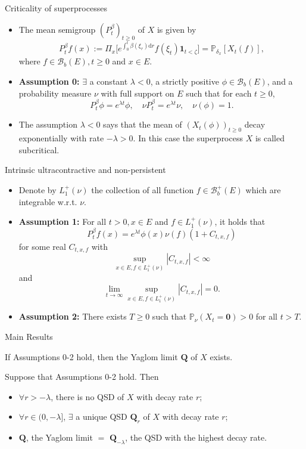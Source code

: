 \documentclass[xcolor=dvipsnames]{beamer}
\begin{document}
\begin{frame}{Criticality of superprocesses}
\begin{itemize}
\item 
	The mean semigroup $(P_t^\beta)_{t\geq 0}$ of $X$ is given by 
\[
	P_t^\beta f(x) 
	:= \Pi_x\Big[e^{\int_0^t \beta(\xi_r) \mathrm dr} f(\xi_t) \mathbf 1_{t< \zeta}\Big]
	= \mathbb P_{\delta_x}[X_t(f)],
\]
	where $f \in \mathcal B_b(E), t\geq 0$ and $x\in E$.
\item
	{\bf Assumption 0:} $\exists$ a constant $\lambda < 0$, a strictly positive $\phi\in \mathcal B_b(E)$, and a probability measure $\nu$ with full support on $E$ such that for each $t\geq 0$,
\[
	P_t^\beta \phi = e^{\lambda t}\phi,
	\quad \nu P_t^\beta = e^{\lambda t}\nu,
	\quad \nu(\phi) = 1.
\]
\item
	The assumption $\lambda < 0$ says that the mean of $(X_t(\phi))_{t\geq 0}$ decay exponentially with rate $-\lambda>0$. 
	In this case the superprocess $X$ is called {\color{red} subcritical}. 
\end{itemize}
\end{frame}

\begin{frame}{Intrinsic ultracontractive and non-persistent}
\begin{itemize}
\item
	Denote by $L_1^+(\nu)$ the collection of all function $f\in \mathcal B_b^+(E)$ which are integrable w.r.t. $\nu$.
\item 
	{\bf Assumption 1:} For all $t>0, x\in E$ and $f\in L_1^+(\nu)$, it holds that 
	\[
		P_t^\beta f(x) = e^{\lambda t} \phi(x) \nu(f) (1+ C_{t,x,f})
	\] 
	for some real $C_{t,x,f}$ with
	\[\sup_{x\in E, f\in L_1^+(\nu)}|C_{t,x,f}|< \infty\] and
	\[\lim_{t\to \infty}\sup_{x\in E, f\in L_1^+(\nu)}|C_{t,x,f}| =0.\]
\item
	{\bf Assumption 2:} There exists $T\geq 0$ such that $\mathbb P_\nu(X_t=\mathbf 0)>0$ for all $t>T$. 
\end{itemize}
\end{frame}

\begin{frame}{Main Results}
\begin{theorem}
	If Assumptions 0-2 hold, then the Yaglom limit $\mathbf Q$ of $X$ exists. 
\end{theorem}
\begin{theorem}
	Suppose that Assumptions 0-2 hold. Then 
\begin{itemize}
	\item 
	$\forall r > -\lambda$, there is no QSD of $X$ with decay rate $r$;
	\item
	$\forall r\in (0,-\lambda]$, $\exists$ a unique QSD $\mathbf Q_r$ of $X$ with decay rate $r$;
	\item
	$\mathbf Q$, the Yaglom limit $=$ $\mathbf Q_{-\lambda}$, the QSD with the highest decay rate.   
\end{itemize}
\end{theorem}
\end{frame}
\end{document}
